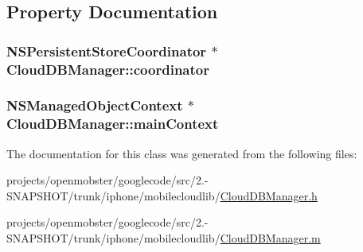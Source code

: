 \subsection{\-Property \-Documentation}
\hypertarget{interface_cloud_d_b_manager_ae746e4050924c592224c40ad70de04c5}{
\subsubsection[{coordinator}]{\setlength{\rightskip}{0pt plus 5cm}\-N\-S\-Persistent\-Store\-Coordinator $\ast$ \-Cloud\-D\-B\-Manager\-::coordinator}}
\label{interface_cloud_d_b_manager_ae746e4050924c592224c40ad70de04c5}
\hypertarget{interface_cloud_d_b_manager_a9c6d73a6c2cf4a6adb6235779cbc4aac}{
\subsubsection[{main\-Context}]{\setlength{\rightskip}{0pt plus 5cm}\-N\-S\-Managed\-Object\-Context $\ast$ \-Cloud\-D\-B\-Manager\-::main\-Context}}
\label{interface_cloud_d_b_manager_a9c6d73a6c2cf4a6adb6235779cbc4aac}


\-The documentation for this class was generated from the following files\-:\begin{DoxyCompactItemize}
\item 
projects/openmobster/googlecode/src/2.-\/\-S\-N\-A\-P\-S\-H\-O\-T/trunk/iphone/mobilecloudlib/\hyperlink{_cloud_d_b_manager_8h}{\-Cloud\-D\-B\-Manager.\-h}\item 
projects/openmobster/googlecode/src/2.-\/\-S\-N\-A\-P\-S\-H\-O\-T/trunk/iphone/mobilecloudlib/\hyperlink{_cloud_d_b_manager_8m}{\-Cloud\-D\-B\-Manager.\-m}\end{DoxyCompactItemize}
